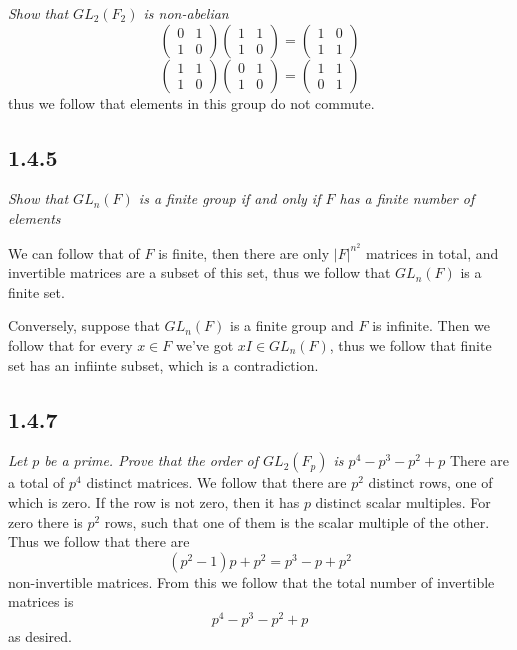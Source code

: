 \documentclass[11pt,oneside,titlepage]{book}
\begin{document}
\textit{Show that $GL_2(F_2)$ is non-abelian}
$$
\begin{pmatrix}
  0 & 1 \\
  1 & 0
\end{pmatrix}
\begin{pmatrix}
  1 & 1 \\
  1 & 0
\end{pmatrix} =
\begin{pmatrix}
  1 & 0 \\
  1 & 1
\end{pmatrix}
$$
$$
\begin{pmatrix}
  1 & 1 \\
  1 & 0
\end{pmatrix}
\begin{pmatrix}
  0 & 1 \\
  1 & 0
\end{pmatrix} = 
\begin{pmatrix}
  1 & 1 \\
  0 & 1
\end{pmatrix}
$$
thus we follow that elements in this group do not commute.

\subsection{1.4.5}

\textit{Show that $GL_n(F)$ is a finite group if and only if $F$ has a finite number of
  elements}

We can follow that of $F$ is finite, then there are only $|F|^{n^2}$ matrices in total,
and invertible matrices are a subset of this set, thus we follow that $GL_n(F)$ is a
finite set.

Conversely, suppose that $GL_n(F)$ is a finite group and $F$ is infinite. Then we follow that
for every $x \in F$ we've got $xI \in GL_n(F)$, thus we follow that finite set has
an infiinte subset, which is a contradiction.

\subsection*{1.4.7}

\textit{Let $p$ be a prime. Prove that the order of $GL_2(F_p)$ is $p^4 - p^3 - p^2 + p$}
There are a total of $p^{4}$ distinct matrices. We follow that there
are $p^2$ distinct rows, one of which is zero. If the row is not zero, then it has $p$
distinct scalar multiples. For zero there is $p^2$ rows, such that one of them is
the scalar multiple of the other. Thus we follow that there are
$$(p^2 - 1)p + p^2 = p^3 - p + p^2$$
non-invertible matrices. From this we follow that the total number of invertible matrices
is
$$p^4 - p^3 - p^2 + p$$
as desired.
\end{document}
